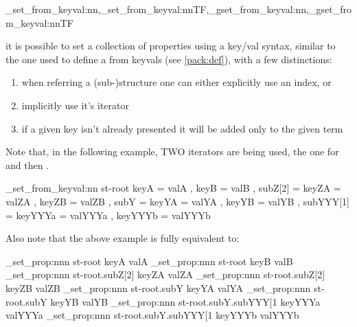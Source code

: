 \documentclass[10pt]{article}
\begin{document}
\begin{codedescribe}{\starray_set_from_keyval:nn,\starray_set_from_keyval:nnTF,\starray_gset_from_keyval:nn,\starray_gset_from_keyval:nnTF}
\begin{codesyntax}%
\end{codesyntax}
\end{codedescribe}

it is possible to set a collection of properties using a key/val syntax, similar to the one used to define a  from keyvals (see \ref{pack:def}), with a few distinctions:
\begin{enumerate}
  \item when referring a (sub-)structure one can either explicitly use an index, or
  \item  implicitly use it's iterator 
  \item if a given key isn't already presented it will be added only to the given term
\end{enumerate}

 Note that, in the following example, TWO iterators are being used, the one for  and then .

\begin{codestore}[store-env=keyval.demo8]
\starray_set_from_keyval:nn {st-root} 
  {
    keyA = valA ,
    keyB = valB ,
    subZ[2] = 
      {
        keyZA = valZA ,
        keyZB = valZB ,
      }
    subY  =
      {
        keyYA = valYA ,
        keyYB = valYB ,
        subYYY[1] =
          {
            keyYYYa = valYYYa ,
            keyYYYb = valYYYb 
          }
      }
  }  
\end{codestore}


Also note that the above example is fully equivalent to:

\begin{codestore}[store-env=keyval.demo9]
\starray_set_prop:nnn {st-root} {keyA} {valA}
\starray_set_prop:nnn {st-root} {keyB} {valB}
\starray_set_prop:nnn {st-root.subZ[2]} {keyZA} {valZA}
\starray_set_prop:nnn {st-root.subZ[2]} {keyZB} {valZB}
\starray_set_prop:nnn {st-root.subY} {keyYA} {valYA}
\starray_set_prop:nnn {st-root.subY} {keyYB} {valYB}
\starray_set_prop:nnn {st-root.subY.subYYY[1} {keyYYYa} {valYYYa}
\starray_set_prop:nnn {st-root.subY.subYYY[1} {keyYYYb} {valYYYb}
\end{codestore}
\end{document}
